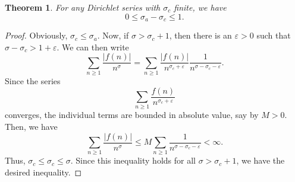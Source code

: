 \documentclass[12pt]{article}
\theoremstyle{thmstyle}
\newtheorem{theorem}{Theorem}[section]
\theoremstyle{defstyle}
\renewcommand{\le}{\leqslant}
\renewcommand{\ge}{\geqslant}
\begin{document}
\begin{theorem}
    For any Dirichlet series with $\sigma_c$ finite, we have 
    \begin{equation*}
        0\le \sigma_a - \sigma_c \le 1.
    \end{equation*}
\end{theorem}
\begin{proof}
    Obviously, $\sigma_c\le \sigma_a$. Now, if $\sigma > \sigma_c + 1$, then there is an $\varepsilon > 0$ such that $\sigma - \sigma_c > 1 + \varepsilon$. We can then write 
    \begin{equation*}
        \sum_{n\ge 1}\frac{|f(n)|}{n^\sigma} = \sum_{n\ge 1}\frac{|f(n)|}{n^{\sigma_c + \varepsilon}}\frac{1}{n^{\sigma - \sigma_c - \varepsilon}}.
    \end{equation*}
    Since the series 
    \begin{equation*}
        \sum_{n\ge 1}\frac{f(n)}{n^{\sigma_c + \varepsilon}}
    \end{equation*}
    converges, the individual terms are bounded in absolute value, say by $M > 0$. Then, we have 
    \begin{equation*}
        \sum_{n\ge 1}\frac{|f(n)|}{n^\sigma}\le M\sum_{n\ge 1}\frac{1}{n^{\sigma - \sigma_c - \varepsilon}} < \infty.
    \end{equation*}
    Thus, $\sigma_c\le \sigma_c\le\sigma$. Since this inequality holds for all $\sigma > \sigma_c + 1$, we have the desired inequality.
\end{proof}
\end{document}
